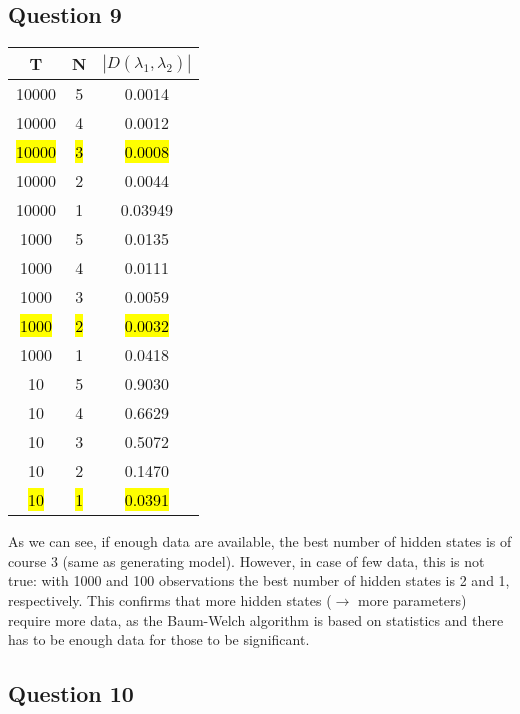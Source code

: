 \documentclass{scrartcl}
\begin{document}
\subsection{Question 9}



\begin{center}
 \begin{tabular}{||c c c||} 
 \hline
 T & N & $|D(\lambda_1, \lambda_2)|$ \\ [0.5ex] 
 \hline\hline
 10000 & 5 & 0.0014 \\ 
 \hline
 10000 & 4 & 0.0012 \\
 \hline
 \hl{10000} & \hl{3} & \hl{0.0008} \\
 \hline
 10000 & 2 & 0.0044 \\
 \hline
 10000 & 1 & 0.03949 \\
 \hline
 \hline
 1000 & 5 & 0.0135 \\ 
 \hline
 1000 & 4 & 0.0111 \\
 \hline
 1000 & 3 & 0.0059 \\
 \hline
 \hl{1000} & \hl{2} & \hl{0.0032} \\
 \hline
 1000 & 1 & 0.0418 \\
 \hline
 \hline
 10 & 5 & 0.9030 \\ 
 \hline
 10 & 4 & 0.6629 \\
 \hline
 10 & 3 & 0.5072 \\
 \hline
 10 & 2 & 0.1470 \\
 \hline
 \hl{10} & \hl{1} & \hl{0.0391} \\ [1ex] 
 \hline
\end{tabular}
\end{center}

As we can see, if enough data are available, the best number of hidden states is of course 3 (same as generating model). However, in case of few data, this is not true: with 1000 and 100 observations the best number of hidden states is 2 and 1, respectively. This confirms that more hidden states ($\rightarrow$ more parameters) require more data, as the Baum-Welch algorithm is based on statistics and there has to be enough data for those to be significant.

\subsection{Question 10}
\end{document}
